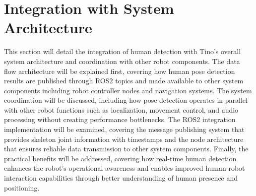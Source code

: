 \section{Integration with System Architecture}
This section will detail the integration of human detection with Tino's overall system architecture and coordination with other robot components. The data flow architecture will be explained first, covering how human pose detection results are published through ROS2 topics and made available to other system components including robot controller nodes and navigation systems. The system coordination will be discussed, including how pose detection operates in parallel with other robot functions such as localization, movement control, and audio processing without creating performance bottlenecks. The ROS2 integration implementation will be examined, covering the message publishing system that provides skeleton joint information with timestamps and the node architecture that ensures reliable data transmission to other system components. Finally, the practical benefits will be addressed, covering how real-time human detection enhances the robot's operational awareness and enables improved human-robot interaction capabilities through better understanding of human presence and positioning.
